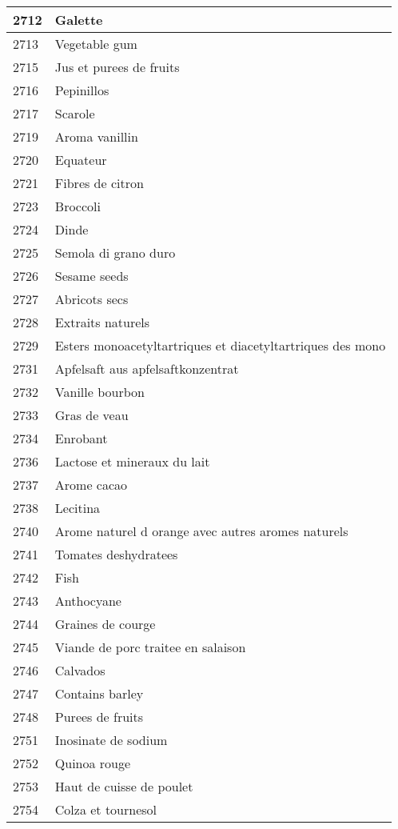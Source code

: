 \begin{longtable}{|l|l|}
2712 & Galette \\ \hline 
2713 & Vegetable gum \\ \hline 
2715 & Jus et purees de fruits \\ \hline 
2716 & Pepinillos \\ \hline 
2717 & Scarole \\ \hline 
2719 & Aroma vanillin \\ \hline 
2720 & Equateur \\ \hline 
2721 & Fibres de citron \\ \hline 
2723 & Broccoli \\ \hline 
2724 & Dinde \\ \hline 
2725 & Semola di grano duro \\ \hline 
2726 & Sesame seeds \\ \hline 
2727 & Abricots secs \\ \hline 
2728 & Extraits naturels \\ \hline 
2729 & Esters monoacetyltartriques et diacetyltartriques des mono \\ \hline 
2731 & Apfelsaft aus apfelsaftkonzentrat \\ \hline 
2732 & Vanille bourbon \\ \hline 
2733 & Gras de veau \\ \hline 
2734 & Enrobant \\ \hline 
2736 & Lactose et mineraux du lait \\ \hline 
2737 & Arome cacao \\ \hline 
2738 & Lecitina \\ \hline 
2740 & Arome naturel d orange avec autres aromes naturels \\ \hline 
2741 & Tomates deshydratees \\ \hline 
2742 & Fish \\ \hline 
2743 & Anthocyane \\ \hline 
2744 & Graines de courge \\ \hline 
2745 & Viande de porc traitee en salaison \\ \hline 
2746 & Calvados \\ \hline 
2747 & Contains barley \\ \hline 
2748 & Purees de fruits \\ \hline 
2751 & Inosinate de sodium \\ \hline 
2752 & Quinoa rouge \\ \hline 
2753 & Haut de cuisse de poulet \\ \hline 
2754 & Colza et tournesol \\ \hline 

\end{longtable}
